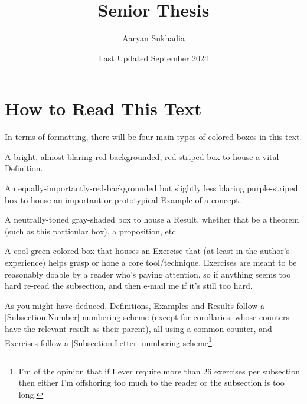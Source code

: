 \documentclass[11pt, x11names]{book}
\newcounter{exercises}
\begin{document}
\title{Senior Thesis}

\author{Aaryan Sukhadia}
\date{Last Updated September 2024}
\onehalfspacing

\maketitle

\tableofcontents

\newpage

\section*{How to Read This Text}
\label{section: How to Read This Text}

In terms of formatting, there will be four main types of colored boxes in this text.
\begin{defn} 
    A bright, almost-blaring red-backgrounded, red-striped box to house a vital Definition.
\end{defn}
\begin{example}
    An equally-importantly-red-backgrounded but slightly less blaring purple-striped box to house an important or prototypical Example of a concept.
\end{example}
\begin{theorem}
    A neutrally-toned gray-shaded box to house a Result, whether that be a theorem (such as this particular box), a proposition, etc.
\end{theorem}
\begin{exercise}
    A cool green-colored box that houses an Exercise that (at least in the author's experience) helps grasp or hone a core tool/technique. Exercises are meant to be reasonably doable by a reader who's paying attention, so if anything seems too hard re-read the subsection, and then e-mail me if it's still too hard.
\end{exercise}

As you might have deduced, Definitions, Examples and Results follow a [Subsection.Number] numbering scheme (except for corollaries, whose counters have the relevant result as their parent), all using a common counter, and Exercises follow a [Subsection.Letter] numbering scheme\footnote{I'm of the opinion that if I ever require more than 26 exercises per subsection then either I'm offshoring too much to the reader or the subsection is too long.}.\\
\end{document}
